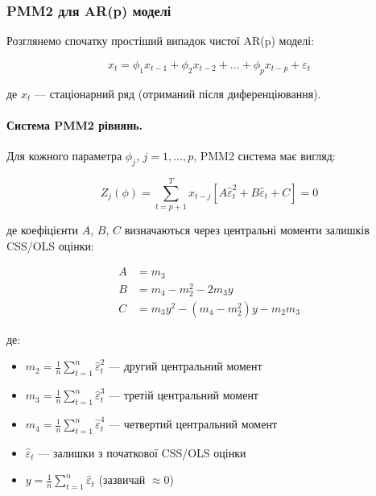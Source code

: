 \subsubsection{PMM2 для AR(p) моделі}
\label{subsubsec:pmm2_ar}

Розглянемо спочатку простіший випадок чистої AR(p) моделі:

\begin{equation}
\label{eq:ar_model}
x_t = \phi_1 x_{t-1} + \phi_2 x_{t-2} + \ldots + \phi_p x_{t-p} + \varepsilon_t
\end{equation}

\noindent де $x_t$ --- стаціонарний ряд (отриманий після диференціювання).

\paragraph{Система PMM2 рівнянь.}

Для кожного параметра $\phi_j$, $j=1,\ldots,p$, PMM2 система має вигляд:

\begin{equation}
\label{eq:pmm2_system}
Z_j(\phi) = \sum_{t=p+1}^{T} x_{t-j} \left[ A \hat{\varepsilon}_t^2 + B \hat{\varepsilon}_t + C \right] = 0
\end{equation}

\noindent де коефіцієнти $A$, $B$, $C$ визначаються через центральні моменти залишків CSS/OLS оцінки:

\begin{align}
A &= m_3 \label{eq:coeff_A}\\
B &= m_4 - m_2^2 - 2m_3 y \label{eq:coeff_B}\\
C &= m_3 y^2 - (m_4 - m_2^2)y - m_2 m_3 \label{eq:coeff_C}
\end{align}

\noindent де:
\begin{itemize}
    \item $m_2 = \frac{1}{n}\sum_{t=1}^{n} \hat{\varepsilon}_t^2$ --- другий центральний момент
    \item $m_3 = \frac{1}{n}\sum_{t=1}^{n} \hat{\varepsilon}_t^3$ --- третій центральний момент
    \item $m_4 = \frac{1}{n}\sum_{t=1}^{n} \hat{\varepsilon}_t^4$ --- четвертий центральний момент
    \item $\hat{\varepsilon}_t$ --- залишки з початкової CSS/OLS оцінки
    \item $y = \frac{1}{n}\sum_{t=1}^{n} \hat{\varepsilon}_t$ (зазвичай $\approx 0$)
\end{itemize}


